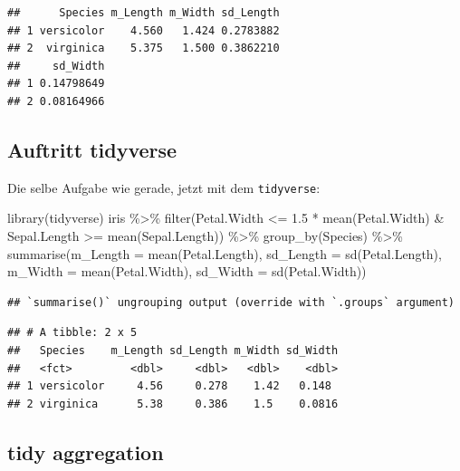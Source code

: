 \documentclass[
]{book}
\newenvironment{Shaded}{\begin{snugshade}}{\end{snugshade}}
\newcommand{\AttributeTok}[1]{\textcolor[rgb]{0.77,0.63,0.00}{#1}}
\newcommand{\FloatTok}[1]{\textcolor[rgb]{0.00,0.00,0.81}{#1}}
\newcommand{\FunctionTok}[1]{\textcolor[rgb]{0.00,0.00,0.00}{#1}}
\newcommand{\NormalTok}[1]{#1}
\newcommand{\SpecialCharTok}[1]{\textcolor[rgb]{0.00,0.00,0.00}{#1}}
\begin{document}
\begin{verbatim}
##      Species m_Length m_Width sd_Length
## 1 versicolor    4.560   1.424 0.2783882
## 2  virginica    5.375   1.500 0.3862210
##     sd_Width
## 1 0.14798649
## 2 0.08164966
\end{verbatim}

\hypertarget{auftritt-tidyverse}{%
\subsection{Auftritt tidyverse}\label{auftritt-tidyverse}}

Die selbe Aufgabe wie gerade, jetzt mit dem \texttt{tidyverse}:

\begin{Shaded}
\begin{Highlighting}[]
\FunctionTok{library}\NormalTok{(tidyverse)}
\NormalTok{iris }\SpecialCharTok{\%\textgreater{}\%} 
  \FunctionTok{filter}\NormalTok{(Petal.Width }\SpecialCharTok{\textless{}=} \FloatTok{1.5} \SpecialCharTok{*} \FunctionTok{mean}\NormalTok{(Petal.Width) }\SpecialCharTok{\&}
\NormalTok{           Sepal.Length }\SpecialCharTok{\textgreater{}=} \FunctionTok{mean}\NormalTok{(Sepal.Length)) }\SpecialCharTok{\%\textgreater{}\%} 
  \FunctionTok{group\_by}\NormalTok{(Species) }\SpecialCharTok{\%\textgreater{}\%} 
  \FunctionTok{summarise}\NormalTok{(}\AttributeTok{m\_Length =} \FunctionTok{mean}\NormalTok{(Petal.Length),}
            \AttributeTok{sd\_Length =} \FunctionTok{sd}\NormalTok{(Petal.Length),}
            \AttributeTok{m\_Width =} \FunctionTok{mean}\NormalTok{(Petal.Width), }
            \AttributeTok{sd\_Width =} \FunctionTok{sd}\NormalTok{(Petal.Width))}
\end{Highlighting}
\end{Shaded}

\begin{verbatim}
## `summarise()` ungrouping output (override with `.groups` argument)
\end{verbatim}

\begin{verbatim}
## # A tibble: 2 x 5
##   Species    m_Length sd_Length m_Width sd_Width
##   <fct>         <dbl>     <dbl>   <dbl>    <dbl>
## 1 versicolor     4.56     0.278    1.42   0.148 
## 2 virginica      5.38     0.386    1.5    0.0816
\end{verbatim}

\hypertarget{tidy-aggregation}{%
\subsection{tidy aggregation}\label{tidy-aggregation}}
\end{document}
